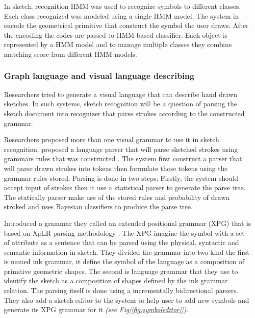 In sketch, recognition HMM was used to recognize symbols to different classes. Each class recognized was modeled using a single HMM model. The system in \cite {HMM53} encode the geometrical primitive that construct the symbol the user draws. After the encoding the codes are passed to HMM based classifier. Each object is represented by a HMM model and to manage multiple classes they combine matching score from different HMM models. 



\subsubsection{Graph language and visual language describing }
\label{sec:Graph language and visual language describing }


Researchers tried to generate a visual language that can describe hand drawn sketches. In such systems, sketch recognition will be a question of parsing the sketch document into recognizer that parse strokes according to the constructed grammar. 

Researchers proposed more than one visual grammar to use it in sketch recognition. \cite{statisticalparsing26} proposed a language parser that will parse sketched strokes using grammars rules that was constructed . The system first construct a parser that will parse drawn strokes into tokens then formulate those tokens using the grammar rules stored. Parsing is done in two steps; Firstly, the system should accept input of strokes then it use a statistical parser to generate the parse tree. The statically parser make use of the stored rules and probability of drawn stroked and uses Bayesian classifiers to produce the parse tree. 

Introduced a grammar they called an extended positional grammar (XPG) that is based on XpLR parsing methodology \cite{XPGParser59} . The XPG imagine the symbol with a set of attribute as a sentence that can be parsed using the physical, syntactic and semantic information in sketch. They divided the grammar into two kind the first is named ink grammar, it define the symbol of the language as a composition of primitive geometric shapes. The second is language grammar that they use to identify the sketch as a composition of shapes defined by the ink grammar relation. The parsing itself is done using a incrementally bidirectional parsers. They also add a sketch editor to the system to help user to add new symbols and generate its XPG grammar for it \textit{(see Fig[\ref{fig:symboleditor}])}.


